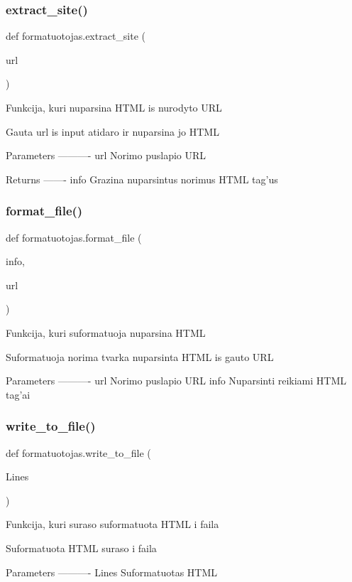 \subsubsection{\texorpdfstring{extract\_site()}{extract\_site()}}
{\footnotesize\ttfamily def formatuotojas.\+extract\+\_\+site (\begin{DoxyParamCaption}\item[{}]{url }\end{DoxyParamCaption})}

\begin{DoxyVerb}Funkcija, kuri nuparsina HTML is nurodyto URL

Gauta url is input atidaro ir nuparsina jo HTML

Parameters
----------
url
Norimo puslapio URL

Returns
-------
info
Grazina nuparsintus norimus HTML tag'us
\end{DoxyVerb}
 \mbox{\label{namespaceformatuotojas_a543e7e6d2cd2505fee71c2d8b1552ffd}} 
\subsubsection{\texorpdfstring{format\_file()}{format\_file()}}
{\footnotesize\ttfamily def formatuotojas.\+format\+\_\+file (\begin{DoxyParamCaption}\item[{}]{info,  }\item[{}]{url }\end{DoxyParamCaption})}

\begin{DoxyVerb}Funkcija, kuri suformatuoja nuparsina HTML

Suformatuoja norima tvarka nuparsinta HTML is gauto URL

Parameters
----------
url
Norimo puslapio URL
info
Nuparsinti reikiami HTML tag'ai      
\end{DoxyVerb}
 \mbox{\label{namespaceformatuotojas_a05a9688bfbecdf2e3fa1ad7a2b9158c3}} 
\subsubsection{\texorpdfstring{write\_to\_file()}{write\_to\_file()}}
{\footnotesize\ttfamily def formatuotojas.\+write\+\_\+to\+\_\+file (\begin{DoxyParamCaption}\item[{}]{Lines }\end{DoxyParamCaption})}

\begin{DoxyVerb}Funkcija, kuri suraso suformatuota HTML i faila

Suformatuota HTML suraso i faila

Parameters
----------
Lines
Suformatuotas HTML
\end{DoxyVerb}
 
